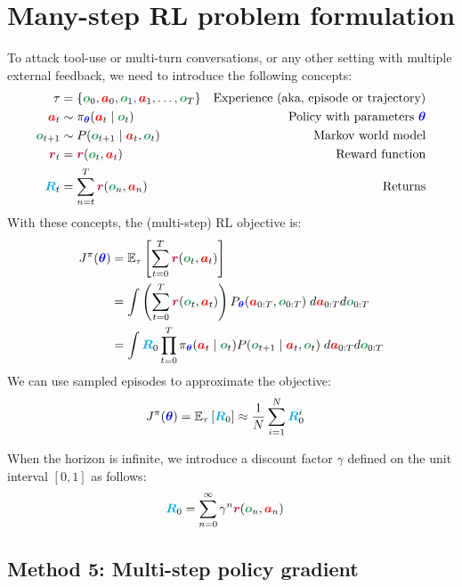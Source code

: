 \documentclass{article}
\newcommand{\colsym}[2]{\ensuremath{\textcolor{#1}{\boldsymbol{#2}}}}
\newcommand{\action}{\colsym{red}{a}}
\newcommand{\obs}{\colsym{ForestGreen}{o}}
\newcommand{\reward}{\colsym{purple}{r}}
\newcommand{\params}{\colsym{blue}{\theta}}
\newcommand{\return}{\ensuremath{\textcolor{cyan}{\boldsymbol{R}}}}
\begin{document}
\section{Many-step RL problem formulation}


To attack tool-use or multi-turn conversations, or any other setting with multiple external feedback, we need to introduce the following concepts:
\begin{align*}
\tau &= \{ \obs_0, \action_0, \obs_1, \action_1, \ldots, \obs_T \} & \text{Experience (aka, episode or trajectory)} \\
\action_t &\sim \pi_{\params}(\action_t \mid \obs_t) & \text{Policy with parameters \params} \\
\obs_{t+1} &\sim P(\obs_{t+1} \mid \action_t, \obs_t) & \text{Markov world model} \\
\reward_t &= \reward(\obs_t, \action_t) & \text{Reward function} \\
\return_t &= \sum_{n=t}^T \reward(\obs_n, \action_n) & \text{Returns}
\end{align*}
With these concepts, the (multi-step) RL objective is:
\begin{align*}
J^{\pi}(\params) &= \mathbb{E}_{\tau} \left[ \sum_{t=0}^{T} \reward(\obs_t, \action_t) \right] \\
&= \int  \left( \sum_{t=0}^{T} \reward(\obs_t, \action_t) \right) P_{\params}(\action_{0:T} , \obs_{0:T}) \; d\action_{0:T} d\obs_{0:T}  \\
&= \int  \return_0 \prod_{t=0}^{T} \pi_{\params}(\action_t \mid \obs_t) P(\obs_{t+1} \mid \action_t, \obs_t) \; d\action_{0:T} d\obs_{0:T}
\end{align*}
We can use sampled episodes to approximate the objective:
\begin{align*}
 J^{\pi}(\params) &= \mathbb{E}_\tau \left[  \return_0   \right] \approx \frac{1}{N} \sum_{i=1}^N  \return_0^{i}
\end{align*}


When the horizon is infinite, we introduce a discount factor $\gamma$ defined on the unit interval $[0,1]$ as follows:
\begin{align*}
\return_0 &= \sum_{n=0}^{\infty} \gamma^n \reward(\obs_n, \action_n)
\end{align*}


\subsection{Method 5: Multi-step policy gradient}
\end{document}
